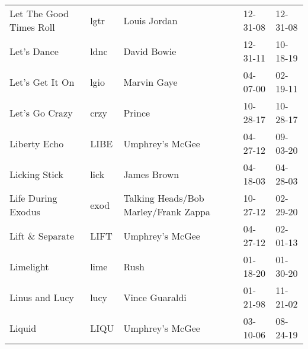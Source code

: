 \begin{longtable}{p{}p{}p{}p{}p{}}
                                                 Let The Good Times Roll &          lgtr &                                             Louis Jordan &              12-31-08 &             12-31-08 \\
                                                             Let's Dance &          ldnc &                                              David Bowie &              12-31-11 &             10-18-19 \\
                                                         Let's Get It On &          lgio &                                              Marvin Gaye &              04-07-00 &             02-19-11 \\
                                                          Let's Go Crazy &          crzy &                                                   Prince &              10-28-17 &             10-28-17 \\
                                                            Liberty Echo &          LIBE &                                          Umphrey's McGee &              04-27-12 &             09-03-20 \\
                                                           Licking Stick &          lick &                                              James Brown &              04-18-03 &             04-28-03 \\
                                                      Life During Exodus &          exod &                     Talking Heads/Bob Marley/Frank Zappa &              10-27-12 &             02-29-20 \\
                                                        Lift \& Separate &          LIFT &                                          Umphrey's McGee &              04-27-12 &             02-01-13 \\
                                                               Limelight &          lime &                                                     Rush &              01-18-20 &             01-30-20 \\
                                                          Linus and Lucy &          lucy &                                           Vince Guaraldi &              01-21-98 &             11-21-02 \\
                                                                  Liquid &          LIQU &                                          Umphrey's McGee &              03-10-06 &             08-24-19 \\

\end{longtable}
